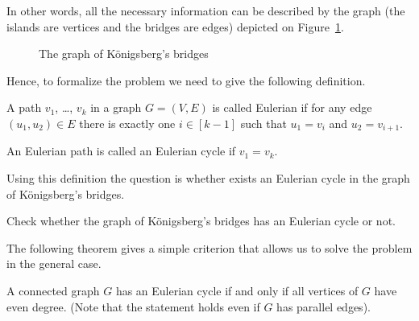 In other words, all the necessary information can be described by the graph
(the islands are vertices and the bridges are edges) depicted on
Figure~\ref{figure:konigsberg-graph}.
\begin{figure}
  \begin{center}
  \end{center}
  \caption{The graph of K\"{o}nigsberg's bridges}
  \label{figure:konigsberg-graph}
\end{figure}
Hence, to formalize the problem we need to give the following definition.
\begin{definition}
  A path $v_1$, \dots, $v_k$ in a graph $G = (V, E)$ is called Eulerian if for
  any edge $(u_1, u_2) \in E$ there is exactly one $i \in [k - 1]$ such that
  $u_1 = v_i$ and $u_2 = v_{i + 1}$.

  An Eulerian path is called an Eulerian cycle if $v_1 = v_k$.
\end{definition}
Using this definition the question is whether exists an Eulerian cycle in the
graph of K\"{o}nigsberg's bridges.

\begin{exercise}
  Check whether the graph of K\"{o}nigsberg's bridges has an Eulerian cycle or
  not.
\end{exercise}

The following theorem gives a simple criterion that allows us to solve the
problem in the general case.
\begin{theorem}
\label{theorem:eulerian}
  A connected graph $G$ has an Eulerian cycle if and only if all vertices
  of $G$ have even degree.
  (Note that the statement holds even if $G$ has parallel edges).
\end{theorem}

